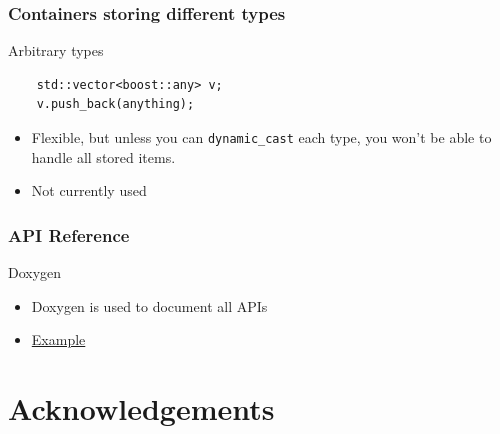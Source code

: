 \documentclass{beamer}
\begin{document}
\begin{frame}[fragile]
  \frametitle{Containers storing different types}
\begin{block}{Arbitrary types}
  \begin{lstlisting}
    std::vector<boost::any> v;
    v.push_back(anything);
\end{lstlisting}
  \begin{itemize}
  \item Flexible, but unless you can \texttt{dynamic\_cast} each type,
    you won't be able to handle all stored items.
  \item Not currently used
  \end{itemize}
\end{block}
\end{frame}



\begin{frame}[fragile]
  \frametitle{API Reference}
\begin{block}{Doxygen}
  \begin{itemize}
  \item Doxygen is used to document all APIs
    \item \href{http://ci.openmicroscopy.org/view/5.1/job/BIOFORMATS-5.1-latest-cpp/doxygen/annotated.html}{Example}
  \end{itemize}
\end{block}
\end{frame}

\section{Acknowledgements}
\end{document}
